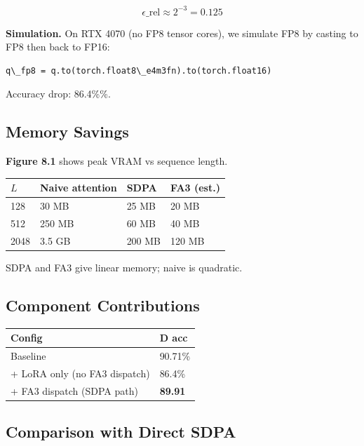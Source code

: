 \[
\epsilon\_{\text{rel}} \approx 2^{-3} = 0.125
\]

\textbf{Simulation.} On RTX 4070 (no FP8 tensor cores), we simulate FP8 by 
casting to FP8 then back to FP16:

\begin{lstlisting}
q\_fp8 = q.to(torch.float8\_e4m3fn).to(torch.float16)
\end{lstlisting}

Accuracy drop: 86.4\%\%.

\subsection{Memory Savings}

\textbf{Figure 8.1} shows peak VRAM vs sequence length.

\begin{table}[H]
\centering
\small
\begin{tabular}{llll}
\toprule
\textbf{$L$} & \textbf{Naive attention} & \textbf{SDPA} & \textbf{FA3 (est.)} \\
\midrule
128 & 30 MB & 25 MB & 20 MB \\
512 & 250 MB & 60 MB & 40 MB \\
2048 & 3.5 GB & 200 MB & 120 MB \\
\bottomrule
\end{tabular}
\end{table}

SDPA and FA3 give linear memory; naive is quadratic.

\subsection{Component Contributions}

\begin{table}[H]
\centering
\small
\begin{tabular}{ll}
\toprule
\textbf{Config} & \textbf{D acc} \\
\midrule
Baseline & 90.71\% \\
+ LoRA only (no FA3 dispatch) & 86.4\% \\
+ FA3 dispatch (SDPA path) & \textbf{89.91} \\
\bottomrule
\end{tabular}
\end{table}

\subsection{Comparison with Direct SDPA}

